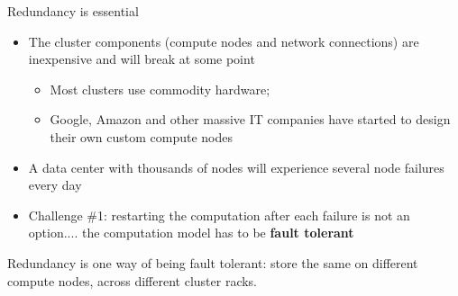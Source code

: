 \begin{frame}{Redundancy is essential}
\begin{itemize}[-]
\item The cluster components (compute nodes and network connections) are inexpensive and will break at some point
\begin{itemize}[-,noitemsep]
\item Most clusters use commodity hardware; 
\item Google, Amazon and other massive IT companies have started to design their own custom compute nodes 
\end{itemize}
\item A data center with thousands of nodes will experience several node failures every day
\item \alert{Challenge \#1}: restarting the computation after each failure is not an option.... the computation model has to be \alert{\textbf{fault tolerant}}
\end{itemize}

\begin{block}{}
\alert{Redundancy} is one way of being fault tolerant: store the same on different compute nodes, across different cluster racks.
\end{block}
\end{frame}



